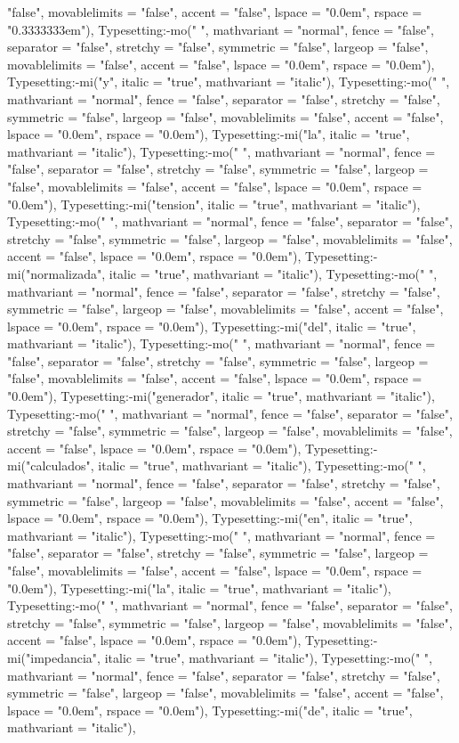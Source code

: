 \documentclass{article}
\begin{document}
\begin{Maple Normal}
{\begin{Maple Normal}
{"false", movablelimits = "false", accent = "false", lspace = "0.0em", rspace = "0.3333333em"), Typesetting:-mo(" ", mathvariant = "normal", fence = "false", separator = "false", stretchy = "false", symmetric = "false", largeop = "false", movablelimits = "false", accent = "false", lspace = "0.0em", rspace = "0.0em"), Typesetting:-mi("y", italic = "true", mathvariant = "italic"), Typesetting:-mo(" ", mathvariant = "normal", fence = "false", separator = "false", stretchy = "false", symmetric = "false", largeop = "false", movablelimits = "false", accent = "false", lspace = "0.0em", rspace = "0.0em"), Typesetting:-mi("la", italic = "true", mathvariant = "italic"), Typesetting:-mo(" ", mathvariant = "normal", fence = "false", separator = "false", stretchy = "false", symmetric = "false", largeop = "false", movablelimits = "false", accent = "false", lspace = "0.0em", rspace = "0.0em"), Typesetting:-mi("tension", italic = "true", mathvariant = "italic"), Typesetting:-mo(" ", mathvariant = "normal", fence = "false", separator = "false", stretchy = "false", symmetric = "false", largeop = "false", movablelimits = "false", accent = "false", lspace = "0.0em", rspace = "0.0em"), Typesetting:-mi("normalizada", italic = "true", mathvariant = "italic"), Typesetting:-mo(" ", mathvariant = "normal", fence = "false", separator = "false", stretchy = "false", symmetric = "false", largeop = "false", movablelimits = "false", accent = "false", lspace = "0.0em", rspace = "0.0em"), Typesetting:-mi("del", italic = "true", mathvariant = "italic"), Typesetting:-mo(" ", mathvariant = "normal", fence = "false", separator = "false", stretchy = "false", symmetric = "false", largeop = "false", movablelimits = "false", accent = "false", lspace = "0.0em", rspace = "0.0em"), Typesetting:-mi("generador", italic = "true", mathvariant = "italic"), Typesetting:-mo(" ", mathvariant = "normal", fence = "false", separator = "false", stretchy = "false", symmetric = "false", largeop = "false", movablelimits = "false", accent = "false", lspace = "0.0em", rspace = "0.0em"), Typesetting:-mi("calculados", italic = "true", mathvariant = "italic"), Typesetting:-mo(" ", mathvariant = "normal", fence = "false", separator = "false", stretchy = "false", symmetric = "false", largeop = "false", movablelimits = "false", accent = "false", lspace = "0.0em", rspace = "0.0em"), Typesetting:-mi("en", italic = "true", mathvariant = "italic"), Typesetting:-mo(" ", mathvariant = "normal", fence = "false", separator = "false", stretchy = "false", symmetric = "false", largeop = "false", movablelimits = "false", accent = "false", lspace = "0.0em", rspace = "0.0em"), Typesetting:-mi("la", italic = "true", mathvariant = "italic"), Typesetting:-mo(" ", mathvariant = "normal", fence = "false", separator = "false", stretchy = "false", symmetric = "false", largeop = "false", movablelimits = "false", accent = "false", lspace = "0.0em", rspace = "0.0em"), Typesetting:-mi("impedancia", italic = "true", mathvariant = "italic"), Typesetting:-mo(" ", mathvariant = "normal", fence = "false", separator = "false", stretchy = "false", symmetric = "false", largeop = "false", movablelimits = "false", accent = "false", lspace = "0.0em", rspace = "0.0em"), Typesetting:-mi("de", italic = "true", mathvariant = "italic"), }
\end{Maple Normal}}
\end{Maple Normal}
\end{document}
